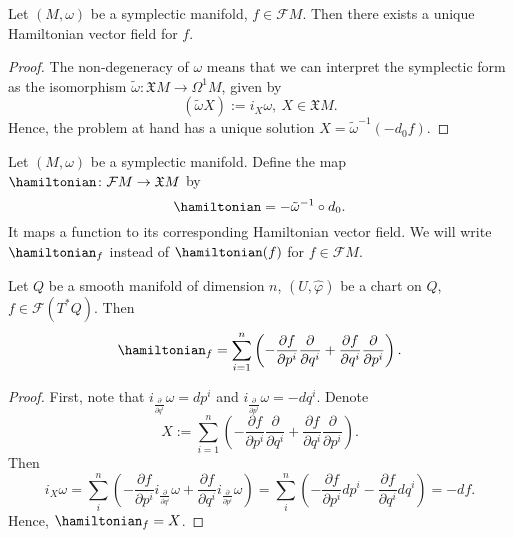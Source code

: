 \begin{proposition}
  Let $(M, \omega)$ be a symplectic manifold, $f \in \mathcal{F} M$.
  Then there exists a unique Hamiltonian vector field for $f$.
\end{proposition}
\begin{proof}
  The non-degeneracy of $\omega$ means that we can interpret the symplectic form
  as the isomorphism $\tilde{\omega} \colon \mathfrak{X} M \to \Omega^1 M$,
  given by
  \begin{equation}
    (\tilde{\omega} X) := i_X \omega,\ X \in \mathfrak{X} M.
  \end{equation}
  Hence, the problem at hand has a unique solution
  $X = \tilde{\omega}^{-1}(- d_0 f)$.
\end{proof}
\begin{definition}
  Let $(M, \omega)$ be a symplectic manifold.
  Define the map $\hamiltonian \colon \mathcal{F} M \to \mathfrak{X} M$ by
  \begin{equation}
    \hamiltonian = - \tilde{\omega}^{-1} \circ d_0.
  \end{equation}
  It maps a function to its corresponding Hamiltonian vector field.
  We will write $\hamiltonian_f$ instead of $\hamiltonian(f)$
  for $f \in \mathcal{F} M$.
\end{definition}
\begin{proposition}
  Let
    $Q$ be a smooth manifold of dimension $n$,
    $(U, \hat{\varphi})$ be a chart on $Q$,
    $f \in \mathcal{F}(T^* Q)$.
  Then
  \begin{equation}
    \hamiltonian_f
    = \sum_{i = 1}^n
    \left(
      - \frac{\partial f}{\partial p^i} \frac{\partial}{\partial q^i}
      + \frac{\partial f}{\partial q^i} \frac{\partial}{\partial p^i}
    \right).
  \end{equation}
\end{proposition}
\begin{proof}
  First, note that
  $i_{\frac{\partial}{\partial q^i}} \omega = d p^i$ and
  $i_{\frac{\partial}{\partial p^i}} \omega = - d q^i$.
  Denote
  \begin{equation}
    X
    := \sum_{i = 1}^n
    \left(
      - \frac{\partial f}{\partial p^i} \frac{\partial}{\partial q^i}
      + \frac{\partial f}{\partial q^i} \frac{\partial}{\partial p^i}
    \right).
  \end{equation}
  Then
  \begin{equation}
    i_X \omega
    = \sum_{i}^n
    \left(
      - \frac{\partial f}{\partial p^i} i_{\frac{\partial}{\partial q^i}} \omega
      + \frac{\partial f}{\partial q^i} i_{\frac{\partial}{\partial p^i}} \omega
    \right)
    = \sum_{i}^n
    \left(
      - \frac{\partial f}{\partial p^i} d p^i
      - \frac{\partial f}{\partial q^i} d q^i
    \right)
    = - d f.
  \end{equation}
  Hence, $\hamiltonian_f = X$.
\end{proof}
